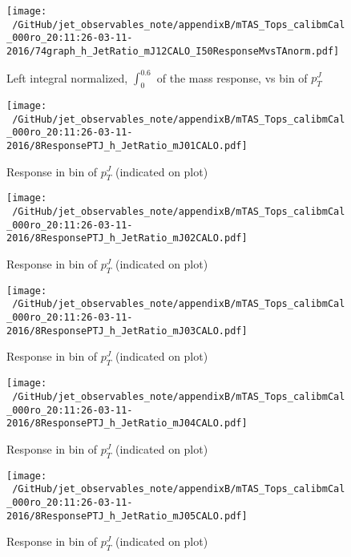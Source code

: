 \begin{figure}

\texttt{[image: ~/GitHub/jet\_observables\_note/appendixB/mTAS\_Tops\_calibmCal\_000ro\_20:11:26-03-11-2016/74graph\_h\_JetRatio\_mJ12CALO\_I50ResponseMvsTAnorm.pdf]}
\caption{Left integral normalized, $\int_{0}^{0.6} $ of the mass response, vs bin of  $p_{T}^{J}$}

\end{figure}
 \clearpage %
\begin{figure}

\texttt{[image: ~/GitHub/jet\_observables\_note/appendixB/mTAS\_Tops\_calibmCal\_000ro\_20:11:26-03-11-2016/8ResponsePTJ\_h\_JetRatio\_mJ01CALO.pdf]}
\caption{Response in bin of  $p_{T}^{J}$ (indicated on plot)} 

\end{figure}

\begin{figure}

\texttt{[image: ~/GitHub/jet\_observables\_note/appendixB/mTAS\_Tops\_calibmCal\_000ro\_20:11:26-03-11-2016/8ResponsePTJ\_h\_JetRatio\_mJ02CALO.pdf]}
\caption{Response in bin of  $p_{T}^{J}$ (indicated on plot)} 

\end{figure}

\begin{figure}

\texttt{[image: ~/GitHub/jet\_observables\_note/appendixB/mTAS\_Tops\_calibmCal\_000ro\_20:11:26-03-11-2016/8ResponsePTJ\_h\_JetRatio\_mJ03CALO.pdf]}
\caption{Response in bin of  $p_{T}^{J}$ (indicated on plot)} 

\end{figure}

\begin{figure}

\texttt{[image: ~/GitHub/jet\_observables\_note/appendixB/mTAS\_Tops\_calibmCal\_000ro\_20:11:26-03-11-2016/8ResponsePTJ\_h\_JetRatio\_mJ04CALO.pdf]}
\caption{Response in bin of  $p_{T}^{J}$ (indicated on plot)} 

\end{figure}

\begin{figure}

\texttt{[image: ~/GitHub/jet\_observables\_note/appendixB/mTAS\_Tops\_calibmCal\_000ro\_20:11:26-03-11-2016/8ResponsePTJ\_h\_JetRatio\_mJ05CALO.pdf]}
\caption{Response in bin of  $p_{T}^{J}$ (indicated on plot)} 

\end{figure}

